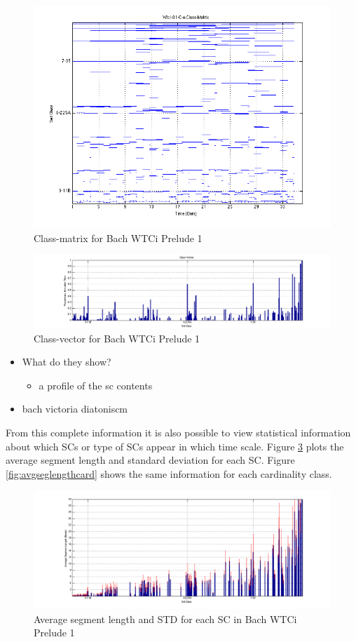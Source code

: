 \documentclass{article}
\begin{document}
\begin{figure}[htb]
\centering
\includegraphics[width=.9\linewidth]{../plots/classmat.png}
\caption{\label{fig:classmat}Class-matrix for Bach WTCi Prelude 1}
\end{figure}
\begin{figure}[htb]
\centering
\includegraphics[width=.9\linewidth]{../plots/classvec.png}
\caption{\label{fig:classvec}Class-vector for Bach WTCi Prelude 1}
\end{figure}

\begin{itemize}
\item What do they show?
\begin{itemize}
\item a profile of the sc contents
\end{itemize}
\item bach victoria diatoniscm
\end{itemize}

From this complete information it is also possible to view statistical
information about which SCs or type of SCs appear in which time
scale. Figure \ref{fig:avgseglengthsc} plots the average segment
length and standard deviation for each SC. Figure
\ref{fig:avgseglengthcard} shows the same information for each
cardinality class.

\begin{figure}[htb]
\centering
\includegraphics[width=.9\linewidth]{../plots/avgseglengthsc.png}
\caption{\label{fig:avgseglengthsc}Average segment length and STD for each SC in Bach WTCi Prelude 1}
\end{figure}
\end{document}
